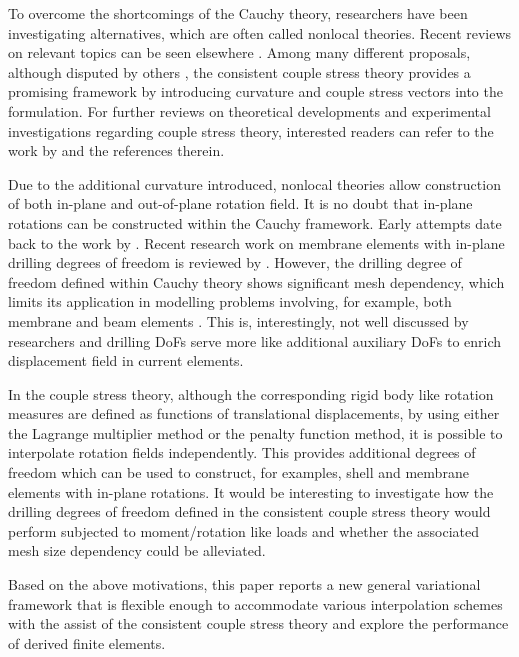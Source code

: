 \documentclass[3p,sort&compress,11pt,fleqn]{elsarticle}
\begin{document}
To overcome the shortcomings of the Cauchy theory, researchers have been investigating alternatives, which are often called nonlocal theories. Recent reviews on relevant topics can be seen elsewhere \citep{Maugin2010,Altenbach2011,Srinivasa2017,Shaat2020}. Among many different proposals, although disputed by others \citep{Neff2016}, the consistent couple stress theory \citep{Hadjesfandiari2011} provides a promising framework by introducing curvature and couple stress vectors into the formulation. For further reviews on theoretical developments and experimental investigations regarding couple stress theory, interested readers can refer to the work by \citet{Pedgaonkar2021} and the references therein.

Due to the additional curvature introduced, nonlocal theories allow construction of both in-plane and out-of-plane rotation field. It is no doubt that in-plane rotations can be constructed within the Cauchy framework. Early attempts date back to the work by \citet{Allman1984}. Recent research work on membrane elements with in-plane drilling degrees of freedom is reviewed by \citet{Boutagouga2020}. However, the drilling degree of freedom defined within Cauchy theory shows significant mesh dependency, which limits its application in modelling problems involving, for example, both membrane and beam elements \citep{Chang2020}. This is, interestingly, not well discussed by researchers and drilling DoFs serve more like additional auxiliary DoFs to enrich displacement field in current elements.

In the couple stress theory, although the corresponding rigid body like rotation measures are defined as functions of translational displacements, by using either the Lagrange multiplier method or the penalty function method, it is possible to interpolate rotation fields independently. This provides additional degrees of freedom which can be used to construct, for examples, shell and membrane elements with in-plane rotations. It would be interesting to investigate how the drilling degrees of freedom defined in the consistent couple stress theory would perform subjected to moment/rotation like loads and whether the associated mesh size dependency could be alleviated.

Based on the above motivations, this paper reports a new general variational framework that is flexible enough to accommodate various interpolation schemes with the assist of the consistent couple stress theory \citep{Hadjesfandiari2011} and explore the performance of derived finite elements.
\end{document}
